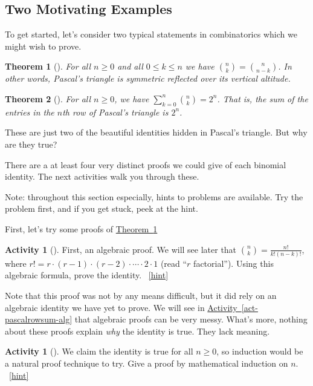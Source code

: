 \documentclass[10pt,]{book}
\theoremstyle{plain}
\newtheorem{theorem}{Theorem}[section]
\theoremstyle{definition}
\theoremstyle{definition}
\theoremstyle{definition}
\newtheorem{activity}[project]{Activity}
\numberwithin{equation}{chapter}
\begin{document}
\subsection[{Two Motivating Examples}]{Two Motivating Examples}\label{subsec-basic-proofs-examples}
\hypertarget{p-548}{}%
To get started, let's consider two typical statements in combinatorics which we might wish to prove.%
\begin{theorem}[{}]\label{thm-pascalsym}
\hypertarget{p-549}{}%
For all \(n \ge 0\) and all \(0 \le k \le n\) we have \(\binom{n}{k} = \binom{n}{n-k}\).  In other words, Pascal's triangle is symmetric reflected over its vertical altitude.%
\end{theorem}
\begin{theorem}[{}]\label{thm-pascalrowsum}
\hypertarget{p-550}{}%
For all \(n \ge 0\), we have \(\sum_{k=0}^n \binom{n}{k} = 2^n\).  That is, the sum of the entries in the \(n\)th row of Pascal's triangle is \(2^n\).%
\end{theorem}
\hypertarget{p-551}{}%
These are just two of the beautiful identities hidden in Pascal's triangle.  But why are they true?%
\par
\hypertarget{p-552}{}%
There are a at least four very distinct proofs we could give of each binomial identity.  The next activities walk you through these.%
\par
\hypertarget{p-553}{}%
Note: throughout this section especially, hints to problems are available.  Try the problem first, and if you get stuck, peek at the hint.%
\par
\hypertarget{p-554}{}%
First, let's try some proofs of \hyperref[thm-pascalsym]{Theorem~\ref{thm-pascalsym}}%
\begin{activity}[]\label{activity-65}
\hypertarget{p-555}{}%
First, an algebraic proof.  We will see later that \(\binom{n}{k} = \frac{n!}{k!(n-k)!}\), where \(r! = r \cdot (r-1) \cdot (r-2) \cdot\cdots\cdot 2\cdot 1\) (read ``\(r\) factorial'').  Using this algebraic formula, prove the identity.%
~\hfill{\tiny\hyperlink{a-72}{[hint]}\hypertarget{q-72}{}}\end{activity}
\hypertarget{p-557}{}%
Note that this proof was not by any means difficult, but it did rely on an algebraic identity we have yet to prove.  We will see in \hyperref[act-pascalrowsum-alg]{Activity~\ref{act-pascalrowsum-alg}} that algebraic proofs can be very messy.  What's more, nothing about these proofs explain \emph{why} the identity is true.  They lack meaning.%
\begin{activity}[]\label{activity-66}
\hypertarget{p-558}{}%
We claim the identity is true for all \(n \ge 0\), so induction would be a natural proof technique to try.  Give a proof by mathematical induction on \(n\).%
~\hfill{\tiny\hyperlink{a-73}{[hint]}\hypertarget{q-73}{}}\end{activity}
\end{document}
